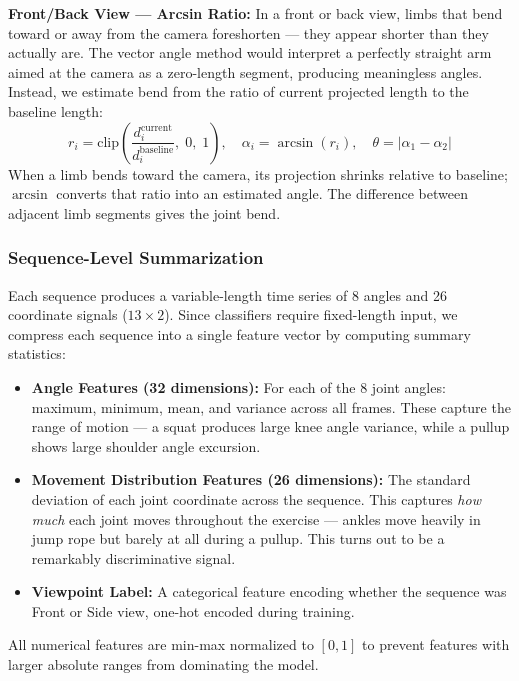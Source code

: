 \documentclass[10pt, twocolumn, a4paper]{article}
\begin{document}
\textbf{Front/Back View --- Arcsin Ratio:} In a front or back view, limbs that bend toward or away from the camera foreshorten — they appear shorter than they actually are. The vector angle method would interpret a perfectly straight arm aimed at the camera as a zero-length segment, producing meaningless angles. Instead, we estimate bend from the ratio of current projected length to the baseline length:
\begin{equation}
r_i = \text{clip}\!\left(\frac{d_i^{\text{current}}}{d_i^{\text{baseline}}},\; 0,\; 1\right), \quad \alpha_i = \arcsin(r_i), \quad \theta = |\alpha_1 - \alpha_2|
\end{equation}
When a limb bends toward the camera, its projection shrinks relative to baseline; $\arcsin$ converts that ratio into an estimated angle. The difference between adjacent limb segments gives the joint bend.

\subsubsection{Sequence-Level Summarization}
Each sequence produces a variable-length time series of 8 angles and 26 coordinate signals ($13 \times 2$). Since classifiers require fixed-length input, we compress each sequence into a single feature vector by computing summary statistics:

\begin{itemize}
    \item \textbf{Angle Features (32 dimensions):} For each of the 8 joint angles: maximum, minimum, mean, and variance across all frames. These capture the range of motion — a squat produces large knee angle variance, while a pullup shows large shoulder angle excursion.
    \item \textbf{Movement Distribution Features (26 dimensions):} The standard deviation of each joint coordinate across the sequence. This captures \textit{how much} each joint moves throughout the exercise — ankles move heavily in jump rope but barely at all during a pullup. This turns out to be a remarkably discriminative signal.
    \item \textbf{Viewpoint Label:} A categorical feature encoding whether the sequence was Front or Side view, one-hot encoded during training.
\end{itemize}

All numerical features are min-max normalized to $[0, 1]$ to prevent features with larger absolute ranges from dominating the model.
\end{document}
